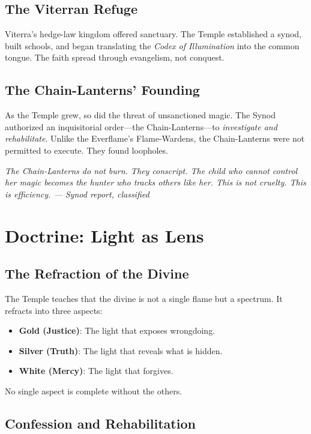\documentclass{book}
\newcommand{\citation}[1]{\textcolor{marginalia}{\small\textit{#1}}}
\begin{document}
\section{The Viterran Refuge}

Viterra's hedge-law kingdom offered sanctuary. The Temple established a synod, built schools, and began translating the \textit{Codex of Illumination} into the common tongue. The faith spread through evangelism, not conquest.

\section{The Chain-Lanterns' Founding}

As the Temple grew, so did the threat of unsanctioned magic. The Synod authorized an inquisitorial order---the Chain-Lanterns---to \textit{investigate and rehabilitate}. Unlike the Everflame's Flame-Wardens, the Chain-Lanterns were not permitted to execute. They found loopholes.

\citation{The Chain-Lanterns do not burn. They conscript. The child who cannot control her magic becomes the hunter who tracks others like her. This is not cruelty. This is efficiency. --- Synod report, classified}

\chapter{Doctrine: Light as Lens}

\section{The Refraction of the Divine}

The Temple teaches that the divine is not a single flame but a spectrum. It refracts into three aspects:

\begin{itemize}
\item \textbf{Gold (Justice)}: The light that exposes wrongdoing.
\item \textbf{Silver (Truth)}: The light that reveals what is hidden.
\item \textbf{White (Mercy)}: The light that forgives.
\end{itemize}

No single aspect is complete without the others.

\section{Confession and Rehabilitation}
\end{document}
